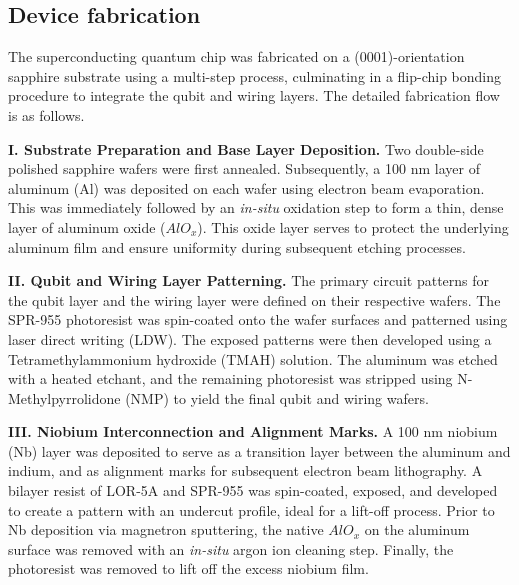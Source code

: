 \documentclass[reprint,superscriptaddress,preprintnumbers,longbibliography,
amsmath,amssymb,aps,floatfix,pra,twocolumn, tightenlines %
]{revtex4-2}
\begin{document}
	\subsection{Device fabrication}
         

    The superconducting quantum chip was fabricated on a (0001)-orientation sapphire substrate using a multi-step process, culminating in a flip-chip bonding procedure to integrate the qubit and wiring layers. The detailed fabrication flow is as follows.
    
    \textbf{I. Substrate Preparation and Base Layer Deposition.}
    Two double-side polished sapphire wafers were first annealed. Subsequently, a 100 nm layer of aluminum (Al) was deposited on each wafer using electron beam evaporation. This was immediately followed by an \textit{in-situ} oxidation step to form a thin, dense layer of aluminum oxide ($AlO_x$). This oxide layer serves to protect the underlying aluminum film and ensure uniformity during subsequent etching processes.
   
      \textbf{II. Qubit and Wiring Layer Patterning.}
    The primary circuit patterns for the qubit layer and the wiring layer were defined on their respective wafers. The SPR-955 photoresist was spin-coated onto the wafer surfaces and patterned using laser direct writing (LDW). The exposed patterns were then developed using a Tetramethylammonium hydroxide (TMAH) solution. The aluminum was etched with a heated etchant, and the remaining photoresist was stripped using N-Methylpyrrolidone (NMP) to yield the final qubit and wiring wafers.
  
      \textbf{III. Niobium Interconnection and Alignment Marks.}
    A 100 nm niobium (Nb) layer was deposited to serve as a transition layer between the aluminum and indium, and as alignment marks for subsequent electron beam lithography. A bilayer resist of LOR-5A and SPR-955 was spin-coated, exposed, and developed to create a pattern with an undercut profile, ideal for a lift-off process. Prior to Nb deposition via magnetron sputtering, the native $AlO_x$ on the aluminum surface was removed with an \textit{in-situ} argon ion cleaning step. Finally, the photoresist was removed to lift off the excess niobium film.
  
\end{document}
